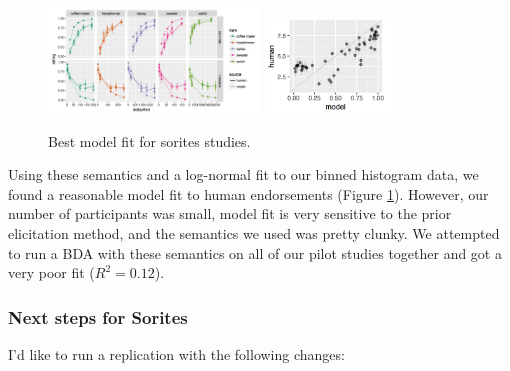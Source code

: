 \documentclass{article}
\begin{document}
   \begin{figure}[bht]
      \begin{center}
         \includegraphics[width=0.5\textwidth]{images/sorites.png}
         \includegraphics[width=0.3\textwidth]{images/sorites-scatter.png}
      \end{center}
      \caption{Best model fit for sorites studies.} 
      \label{fig:sorites}
   \end{figure}

   Using these semantics and a log-normal fit to our binned histogram data, we found a reasonable model fit to human endorsements (Figure \ref{fig:sorites}).
   However, our number of participants was small, model fit is very sensitive to the prior elicitation method, and the semantics we used was pretty clunky.
   We attempted to run a BDA with these semantics on all of our pilot studies together and got a very poor fit ($R^2=0.12$).

   \subsubsection{Next steps for Sorites}

   I'd like to run a replication with the following changes:
\end{document}
